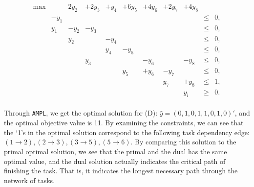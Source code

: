 \[
\begin{array}{ccccccccccc}
 \max &     & 2y_2&+2y_3&+y_4&+6y_5&+4y_6&+2y_7&+4y_8 &      & \\
      & -y_1&     &     &    &     &     &     &      & \leq & 0,\\ 
      &  y_1& -y_2& -y_3&    &     &     &     &      & \leq & 0,\\ 
      &     &  y_2&     &-y_4&     &     &     &      & \leq & 0,\\ 
      &     &     &     & y_4& -y_5&     &     &      & \leq & 0,\\ 
      &     &     &  y_3&    &     & -y_6&     &  -y_8& \leq & 0,\\ 
      &     &     &     &    &  y_5& +y_6& -y_7&      & \leq & 0,\\ 
      &     &     &     &    &     &     &  y_7&  +y_8& \leq & 1,\\ 
      &  & & &    &     &     &     &    y_i  & \geq & 0.\\ 
\end{array}
\tag{D}
\]

Through {\tt AMPL}, we get the optimal solution for (D): $\hat{y} = (0,1,0,1,1,0,1,0)'$, and the optimal objective value is 11. By examining the constraints, we can see that the `1's in the optimal solution correspond to the following task dependency edge: $(1\to2), (2\to3),(3\to5),(5\to6)$. By comparing this solution to the primal optimal solution, we see that the primal and the dual has the same optimal value, and the dual solution actually indicates the critical path of finishing the task. That is, it indicates the longest necessary path through the network of tasks.